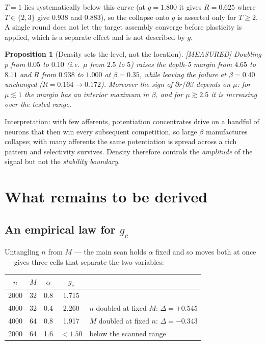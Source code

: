 \documentclass[11pt]{article}
\theoremstyle{definition}
\theoremstyle{plain}
\newtheorem{proposition}[lemma]{Proposition}
\newcommand{\MEASURED}{\textnormal{\footnotesize\textsf{[MEASURED]}}}
\begin{document}
$T=1$ lies systematically below this curve (at $g=1.800$ it gives $R=0.625$
where $T\in\{2,3\}$ give $0.938$ and $0.883$), so the collapse onto $g$ is
asserted only for $T \ge 2$. A single round does not let the target assembly
converge before plasticity is applied, which is a separate effect and is not
described by $g$.

\begin{proposition}[Density sets the level, not the location]\label{prop:mu} \MEASURED
Doubling $p$ from $0.05$ to $0.10$ (i.e.\ $\mu$ from $2.5$ to $5$) raises the
depth-5 margin from $4.65$ to $8.11$ and $R$ from $0.938$ to $1.000$ at
$\beta=0.35$, while leaving the failure at $\beta=0.40$ unchanged
($R = 0.164 \to 0.172$). Moreover the \emph{sign} of $\partial r/\partial
\beta$ depends on $\mu$: for $\mu \lesssim 1$ the margin has an interior
maximum in $\beta$, and for $\mu \gtrsim 2.5$ it is increasing over the tested
range.
\end{proposition}

Interpretation: with few afferents, potentiation concentrates drive on a
handful of neurons that then win every subsequent competition, so large $\beta$
manufactures collapse; with many afferents the same potentiation is spread
across a rich pattern and selectivity survives. Density therefore controls the
\emph{amplitude} of the signal but not the \emph{stability boundary}.

\section{What remains to be derived}

\subsection{An empirical law for \texorpdfstring{$g_c$}{g\_c}}

Untangling $n$ from $M$ --- the main scan holds $\alpha$ fixed and so moves
both at once --- gives three cells that separate the two variables:

\begin{center}
\begin{tabular}{ccccl}
\toprule
$n$ & $M$ & $\alpha$ & $g_c$ & \\
\midrule
2000 & 32 & 0.8 & 1.715 & \\
4000 & 32 & 0.4 & 2.260 & $n$ doubled at fixed $M$: $\Delta = +0.545$\\
4000 & 64 & 0.8 & 1.917 & $M$ doubled at fixed $n$: $\Delta = -0.343$\\
2000 & 64 & 1.6 & $<1.50$ & below the scanned range\\
\bottomrule
\end{tabular}
\end{center}
\end{document}
